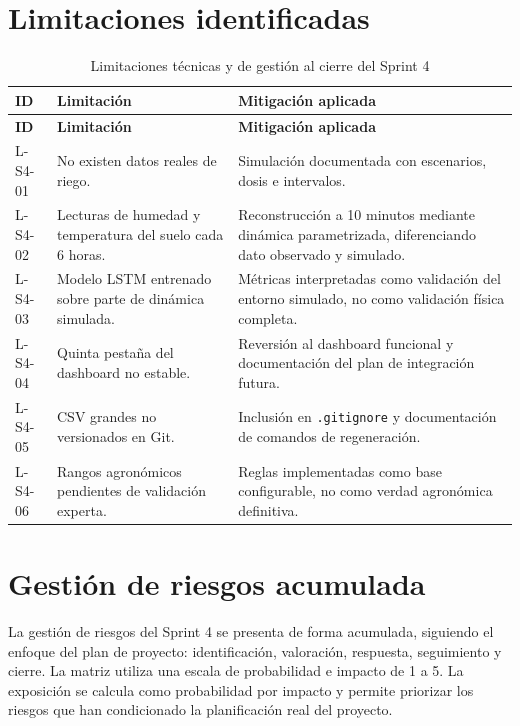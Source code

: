 \documentclass[11pt,a4paper]{article}
\begin{document}
\newpage

\section{Limitaciones identificadas}

\begin{longtable}{p{}p{}p{}}
\caption{Limitaciones técnicas y de gestión al cierre del Sprint 4}\\
\toprule
\textbf{ID} & \textbf{Limitación} & \textbf{Mitigación aplicada} \\
\midrule
\endfirsthead
\toprule
\textbf{ID} & \textbf{Limitación} & \textbf{Mitigación aplicada} \\
\midrule
\endhead
L-S4-01 & No existen datos reales de riego. & Simulación documentada con escenarios, dosis e intervalos. \\
L-S4-02 & Lecturas de humedad y temperatura del suelo cada 6 horas. & Reconstrucción a 10 minutos mediante dinámica parametrizada, diferenciando dato observado y simulado. \\
L-S4-03 & Modelo LSTM entrenado sobre parte de dinámica simulada. & Métricas interpretadas como validación del entorno simulado, no como validación física completa. \\
L-S4-04 & Quinta pestaña del dashboard no estable. & Reversión al dashboard funcional y documentación del plan de integración futura. \\
L-S4-05 & CSV grandes no versionados en Git. & Inclusión en \texttt{.gitignore} y documentación de comandos de regeneración. \\
L-S4-06 & Rangos agronómicos pendientes de validación experta. & Reglas implementadas como base configurable, no como verdad agronómica definitiva. \\
\bottomrule
\end{longtable}

\newpage

\section{Gestión de riesgos acumulada}

La gestión de riesgos del Sprint 4 se presenta de forma acumulada, siguiendo el enfoque del plan de proyecto: identificación, valoración, respuesta, seguimiento y cierre. La matriz utiliza una escala de probabilidad e impacto de 1 a 5. La exposición se calcula como probabilidad por impacto y permite priorizar los riesgos que han condicionado la planificación real del proyecto.
\end{document}
